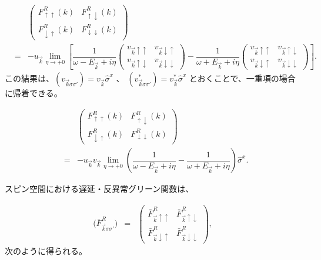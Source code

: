 \documentclass[uplatex,a4j,12pt,dvipdfmx]{jsarticle}
\begin{document}
\begin{eqnarray}
	&&
	\left(
	\begin{array}{cc}
			F_{\uparrow \uparrow}^{R}(k)   & F_{\uparrow \downarrow}^{R}(k)   \\[3mm]
			F_{\downarrow \uparrow}^{R}(k) & F_{\downarrow \downarrow}^{R}(k)
		\end{array}
	\right)
	\nonumber \\ &=&
	-
	u_{ \vec{k} }
	\lim_{\eta \to +0}
	\left[
		\dfrac{ 1 }{ \omega - E_{\vec{k}} + i \eta }
		\left(
		\begin{array}{cc}
				v_{ \vec{k} \uparrow \uparrow }
				 &
				v_{ \vec{k} \downarrow \uparrow }
				\\[3mm]
				v_{ \vec{k} \uparrow \downarrow }
				 &
				v_{ \vec{k} \downarrow \downarrow }
			\end{array}
		\right)
		-
		\dfrac{ 1 }{ \omega + E_{\vec{k}} + i \eta }
		\left(
		\begin{array}{cc}
				v_{ \vec{k} \uparrow \uparrow }
				 &
				v_{ \vec{k} \uparrow \downarrow }
				\\[3mm]
				v_{ \vec{k} \downarrow \uparrow }
				 &
				v_{ \vec{k} \downarrow \downarrow }
			\end{array}
		\right)
		\right]
	.
\end{eqnarray}
%
この結果は、$(v_{\vec{k} \sigma \sigma'}) = v_{\vec{k}} \hat{\sigma}^{x}$
、
$(v_{\vec{k} \sigma \sigma'}^{*}) = v_{\vec{k}}^{*} \hat{\sigma}^{x}$
とおくことで、一重項の場合に帰着できる。

\begin{eqnarray}
	&&
	\left(
	\begin{array}{cc}
			F_{\uparrow \uparrow}^{R}(k)   & F_{\uparrow \downarrow}^{R}(k)   \\[3mm]
			F_{\downarrow \uparrow}^{R}(k) & F_{\downarrow \downarrow}^{R}(k)
		\end{array}
	\right)
	\nonumber \\ &=&
	-
	u_{ \vec{k} }
	v_{ \vec{k} }
	\lim_{\eta \to +0}
	\left(
	\dfrac{ 1 }{ \omega - E_{\vec{k}} + i \eta }
	-
	\dfrac{ 1 }{ \omega + E_{\vec{k}} + i \eta }
	\right)
	\hat{\sigma}^{x}
	.
\end{eqnarray}
%

${}$スピン空間における遅延・反異常グリーン関数は、

\begin{eqnarray}
	\Big(
	\bar{F}_{\vec{k} \sigma \sigma'}^{R}
	\Big)
	&=&
	\left(
	\begin{array}{cc}
			\bar{F}_{\vec{k} \uparrow \uparrow}^{R}   & \bar{F}_{\vec{k} \uparrow \downarrow}^{R}   \\[3mm]
			\bar{F}_{\vec{k} \downarrow \uparrow}^{R} & \bar{F}_{\vec{k} \downarrow \downarrow}^{R}
		\end{array}
	\right)
	,
\end{eqnarray}
%
次のように得られる。
\end{document}
